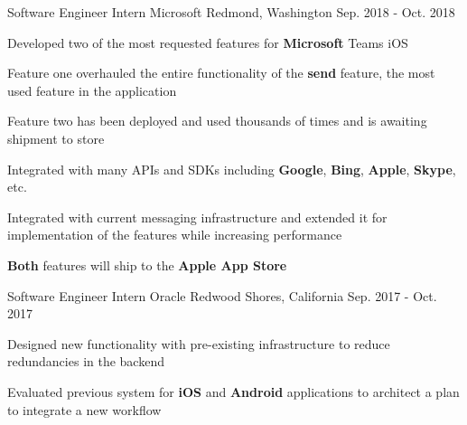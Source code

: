 


\begin{cventries}

\begin{comment}
\cventry
{Software Engineer Intern}
{Microsoft}
{Redmond, Washington}
{Jun. 2018 - Sep. 2018}
{
\begin{cvitems}
\item {Will develop on the frameworks team}
\end{cvitems}
}
\end{comment}

\cventry
	{Software Engineer Intern}
	{Microsoft}
	{Redmond, Washington}
	{Sep. 2018 - Oct. 2018}
{								
	\begin{cvitems} 
		\item {Developed two of the most requested features for \textbf{Microsoft} Teams iOS}
		\item {Feature one overhauled the entire functionality of the \textbf{send} feature, the most used feature in the application}
		\item {Feature two has been deployed and used thousands of times and is awaiting shipment to store}
		\item {Integrated with many APIs and SDKs including \textbf{Google}, \textbf{Bing}, \textbf{Apple}, \textbf{Skype}, etc.}
		\item {Integrated with current messaging infrastructure and extended it for implementation of the features while increasing performance}
		\item {\textbf{Both} features will ship to the \textbf{Apple App Store}}
	\end{cvitems}
}

\cventry
{Software Engineer Intern}
{Oracle}
{Redwood Shores, California}
{Sep. 2017 - Oct. 2017}
{
\begin{cvitems}
\item {Designed new functionality with pre-existing infrastructure to reduce redundancies in the backend}
\item {Evaluated previous system for \textbf{iOS} and \textbf{Android} applications to architect a plan to integrate a new workflow}
\end{cvitems}
}


\end{cventries}
